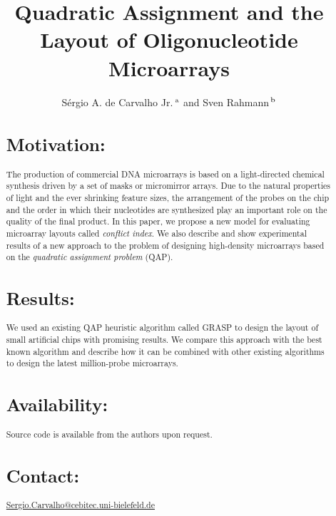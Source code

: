 \documentclass{bioinfo}
\begin{document}

\title[Quadratic assignment and microarrays]{Quadratic Assignment and the Layout of Oligonucleotide Microarrays}
\author[S.A.de Carvalho Jr. and S.Rahmann]{S\'ergio A. de Carvalho Jr.\,$^{\rm a}$ and Sven Rahmann\,$^{\rm b}$}
\address{$^{\rm a}$Graduiertenkolleg Bioinformatik, Bielefeld University, Germany,\\$^{\rm b}$Algorithms and Statistics for Systems Biology, Genome Informatics, Bielefeld University, Germany.}
\maketitle

\begin{abstract}

\section{Motivation:}
The production of commercial DNA microarrays is based on a light-directed chemical synthesis driven by a set of masks or micromirror arrays. Due to the natural properties of light and the ever shrinking feature sizes, the arrangement of the probes on the chip and the order in which their nucleotides are synthesized play an important role on the quality of the final product. In this paper, we propose a new model for evaluating microarray layouts called \emph{conflict index}. We also describe and show experimental results of a new approach to the problem of designing high-density microarrays based on the \emph{quadratic assignment problem} (QAP).
\section{Results:}
We used an existing QAP heuristic algorithm called GRASP to design the layout of small artificial chips with promising results. We compare this approach with the best known algorithm and describe how it can be combined with other existing algorithms to design the latest million-probe microarrays.
\section{Availability:}
Source code is available from the authors upon request.
\section{Contact:} \href{Sergio.Carvalho@cebitec.uni-bielefeld.de}{Sergio.Carvalho@cebitec.uni-bielefeld.de}
\end{abstract}
\end{document}
